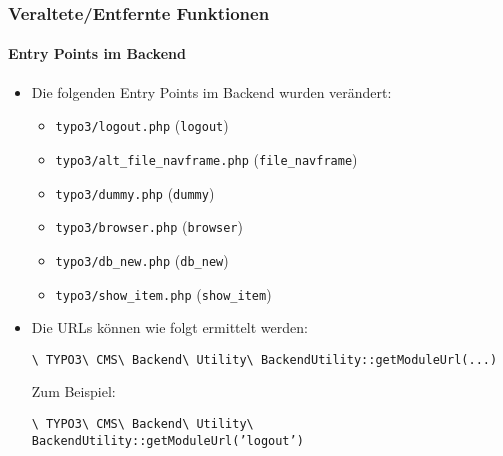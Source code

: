 \begin{frame}[fragile]
	\frametitle{Veraltete/Entfernte Funktionen}
	\framesubtitle{Entry Points im Backend}

	\begin{itemize}

		\item Die folgenden Entry Points im Backend wurden verändert:

			\begin{itemize}
				\item \texttt{typo3/logout.php}					\tabto{6cm}(\begingroup\color{typo3orange}\texttt{logout}\endgroup)
				\item \texttt{typo3/alt\_file\_navframe.php}	\tabto{6cm}(\begingroup\color{typo3orange}\texttt{file\_navframe}\endgroup)
				\item \texttt{typo3/dummy.php}					\tabto{6cm}(\begingroup\color{typo3orange}\texttt{dummy}\endgroup)
				\item \texttt{typo3/browser.php}				\tabto{6cm}(\begingroup\color{typo3orange}\texttt{browser}\endgroup)
				\item \texttt{typo3/db\_new.php}				\tabto{6cm}(\begingroup\color{typo3orange}\texttt{db\_new}\endgroup)
				\item \texttt{typo3/show\_item.php}				\tabto{6cm}(\begingroup\color{typo3orange}\texttt{show\_item}\endgroup)
			\end{itemize}

		\item Die URLs können wie folgt ermittelt werden:

			\smaller
				\texttt{\textbackslash
					TYPO3\textbackslash
					CMS\textbackslash
					Backend\textbackslash
					Utility\textbackslash
					BackendUtility::getModuleUrl(...)}
			\normalsize

			Zum Beispiel:

			\smaller
				\texttt{\textbackslash
					TYPO3\textbackslash
					CMS\textbackslash
					Backend\textbackslash
					Utility\textbackslash
					BackendUtility::getModuleUrl('}\begingroup\color{typo3orange}\texttt{logout}\endgroup\texttt{')}
			\normalsize

	\end{itemize}

\end{frame}



